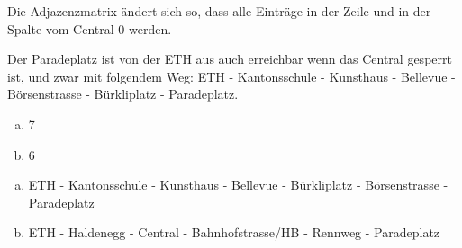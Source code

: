 \begin{lsg}
Die Adjazenzmatrix \"andert sich so, dass alle Eintr\"age in der Zeile und in der Spalte vom Central 0 werden.

Der Paradeplatz ist von der ETH aus auch erreichbar wenn das Central gesperrt ist, und zwar mit folgendem Weg: ETH - Kantonsschule - Kunsthaus - Bellevue - B\"orsenstrasse - B\"urkliplatz - Paradeplatz.
\end{lsg}

\begin{lsg}
\hfill
\begin{enumerate}[(a)]
\item 7 
\item 6
\end{enumerate}\end{lsg}

\begin{lsg}
\hfill
\begin{enumerate}[(a)]
\item ETH - Kantonsschule - Kunsthaus - Bellevue - B\"urkliplatz - B\"orsenstrasse - Paradeplatz
\item ETH - Haldenegg - Central - Bahnhofstrasse/HB - Rennweg - Paradeplatz
\end{enumerate}\end{lsg}




